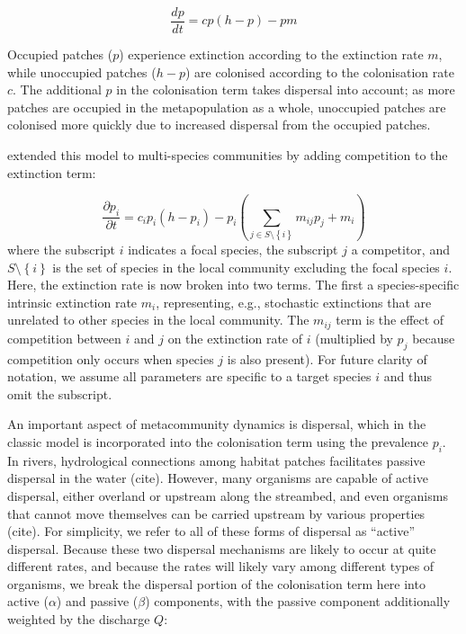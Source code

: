 \begin{equation}
	\frac{dp}{dt} = cp \left( h - p \right) - pm \label{eq:levins}
\end{equation}

Occupied patches ($p$) experience extinction according to the extinction rate $m$, while unoccupied patches ($h-p$) are colonised according to the colonisation rate $c$. 
The additional $p$ in the colonisation term takes dispersal into account; as more patches are occupied in the metapopulation as a whole, unoccupied patches are colonised more quickly due to increased dispersal from the occupied patches.

\textcite{Hunt2009} extended this model to multi-species communities by adding competition to the extinction term:

\begin{equation}
	\frac{\partial p_i}{\partial t} = c_i p_i \left( h-p_i \right) - p_i \left( \sum_{j \in S \setminus \left\{i \right\} }{m_{ij}p_j} + m_i \right) \label{eq:hunt}
\end{equation}
where the subscript $i$ indicates a focal species, the subscript $j$ a competitor, and $S \setminus \left\{i \right\}$ is the set of species in the local community excluding the focal species $i$.
Here, the extinction rate is now broken into two terms.
The first a species-specific intrinsic extinction rate $m_i$, representing, e.g., stochastic extinctions that are unrelated to other species in the local community.
The $m_{ij}$ term is the effect of competition between $i$ and $j$ on the extinction rate of $i$ (multiplied by $p_j$ because competition only occurs when species $j$ is also present).
For future clarity of notation, we assume all parameters are specific to a target species $i$ and thus omit the subscript.

An important aspect of metacommunity dynamics is dispersal, which in the classic model is incorporated into the colonisation term using the prevalence $p_i$.
In rivers, hydrological connections among habitat patches facilitates passive dispersal in the water (cite).
However, many organisms are capable of active dispersal, either overland or upstream along the streambed, and even organisms that cannot move themselves can be carried upstream by various properties (cite).
For simplicity, we refer to all of these forms of dispersal as “active” dispersal.
Because these two dispersal mechanisms are likely to occur at quite different rates, and because the rates will likely vary among different types of organisms, we break the dispersal portion of the colonisation term here into active ($\alpha$) and passive ($\beta$) components, with the passive component additionally weighted by the discharge $Q$:

